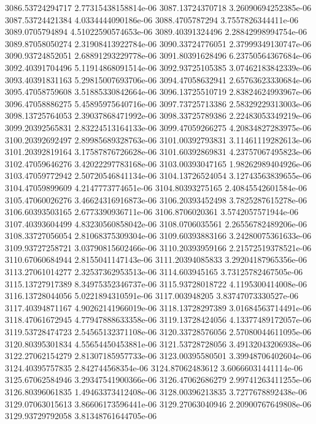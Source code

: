 {3086.53724294717 2.77315438158814e-06
3087.13724370718 3.26090694252385e-06
3087.53724421384 4.0334444090186e-06
3088.4705787294 3.7557826344411e-06
3089.0705794894 4.51022590574653e-06
3089.40391324496 2.28842998994754e-06
3089.87058050274 2.31908413922784e-06
3090.33724776051 2.37999349130747e-06
3090.93724852051 2.68891293229778e-06
3091.80391628496 6.23750564367684e-06
3092.40391704496 5.11914868091514e-06
3092.93725105385 3.07462183842339e-06
3093.40391831163 5.29815007693706e-06
3094.47058632941 2.65763623330684e-06
3095.47058759608 3.51885330842664e-06
3096.13725510719 2.83824624993967e-06
3096.47058886275 5.45895975640716e-06
3097.73725713386 2.58329229313003e-06
3098.13725764053 2.39037868471992e-06
3098.33725789386 2.22483053349219e-06
3099.20392565831 2.83224513164133e-06
3099.47059266275 4.20834827283975e-06
3100.20392692497 2.89985689328763e-06
3101.00392793831 3.11461119282613e-06
3101.20392819164 3.17587876726628e-06
3101.60392869831 4.23757067495823e-06
3102.47059646276 3.42022297783168e-06
3103.00393047165 1.98262989404926e-06
3103.47059772942 2.50720546841134e-06
3104.13726524054 3.12743563839655e-06
3104.47059899609 4.2147773774651e-06
3104.80393275165 2.40845542601584e-06
3105.47060026276 3.46624316916873e-06
3106.20393452498 3.7825287615278e-06
3106.60393503165 2.6773390936711e-06
3106.8706020361 3.5742057571944e-06
3107.40393604499 4.83230560858042e-06
3108.0706035561 2.26556782489206e-06
3108.33727056054 2.81068375309304e-06
3109.60393883166 3.24280075361633e-06
3109.93727258721 3.03790815602466e-06
3110.20393959166 2.21572519378521e-06
3110.67060684944 2.8155041147143e-06
3111.20394085833 3.29204187965356e-06
3113.27061014277 2.32537362953513e-06
3114.603945165 3.73125782467505e-06
3115.13727917389 8.34975352346737e-06
3115.93728018722 4.1195300414008e-06
3116.13728044056 5.0221894310591e-06
3117.003948205 3.83747073330527e-06
3117.40394871167 4.90262141966019e-06
3118.13728297389 3.01684563714491e-06
3118.47061672945 4.77947888633358e-06
3119.13728424056 4.13377489172057e-06
3119.53728474723 2.54565132371108e-06
3120.33728576056 2.57080044611095e-06
3120.80395301834 4.55654450453881e-06
3121.53728728056 3.49132043206938e-06
3122.27062154279 2.81307185957733e-06
3123.00395580501 3.39948706402604e-06
3124.40395757835 2.842744568354e-06
3124.87062483612 3.60666031441114e-06
3125.67062584946 3.29347541900366e-06
3126.47062686279 2.99741263411255e-06
3126.80396061835 1.49463373412408e-06
3128.00396213835 3.7277678892438e-06
3129.07063015613 3.86606173596441e-06
3129.27063040946 2.20900767649808e-06
3129.93729792058 3.81348761644705e-06
}
